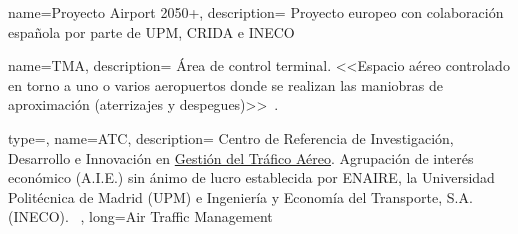 {
    name={Proyecto Airport 2050+},
    description=
    {   
        Proyecto europeo con colaboración española por parte de UPM, CRIDA e INECO
    }
}

{
    name={TMA},
    description=
    {   
        Área de control terminal. <<Espacio aéreo controlado en torno a uno o varios aeropuertos 
        donde se realizan las maniobras de aproximación (aterrizajes y despegues)>>~\cite{ENAIRE-web}.
    }
}



{
    type=\acronymtype,
    name={ATC}, 
    description=
    {
        Centro de Referencia de Investigación, Desarrollo e Innovación 
        en \hyperref[ATC]{Gestión del Tráfico Aéreo}. Agrupación de interés económico (A.I.E.) sin ánimo de lucro 
        establecida por ENAIRE, la Universidad Politécnica de Madrid (UPM) e Ingeniería y Economía del Transporte, S.A. 
        (INECO).~\cite{CRIDA-web}
     }, 
    long={Air Traffic Management}
}
